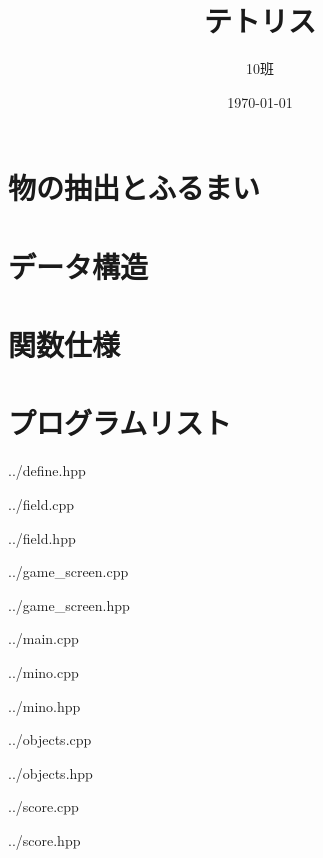 \documentclass[11pt,a4paper]{jsarticle}
\title{テトリス}
\author{10班}
\date{\today}
\begin{document}
  \maketitle

  \section{物の抽出とふるまい}
    
  \clearpage
  \section{データ構造}
    
  \clearpage
  \section{関数仕様}
    
  \clearpage
  \section{プログラムリスト}
    
    {../define.hpp}
    
    {../field.cpp}
    
    {../field.hpp}
    
    {../game_screen.cpp}
    
    {../game_screen.hpp}
    
    {../main.cpp}
    
    {../mino.cpp}
    
    {../mino.hpp}
    
    {../objects.cpp}
    
    {../objects.hpp}
    
    {../score.cpp}
    
    {../score.hpp}
\end{document}
